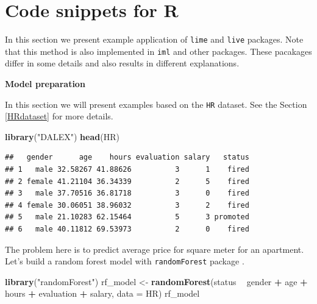 \documentclass[]{book}
\newenvironment{Shaded}{\begin{snugshade}}{\end{snugshade}}
\newcommand{\DataTypeTok}[1]{\textcolor[rgb]{0.13,0.29,0.53}{#1}}
\newcommand{\KeywordTok}[1]{\textcolor[rgb]{0.13,0.29,0.53}{\textbf{#1}}}
\newcommand{\NormalTok}[1]{#1}
\newcommand{\OperatorTok}[1]{\textcolor[rgb]{0.81,0.36,0.00}{\textbf{#1}}}
\newcommand{\StringTok}[1]{\textcolor[rgb]{0.31,0.60,0.02}{#1}}
\theoremstyle{definition}
\theoremstyle{definition}
\theoremstyle{definition}
\theoremstyle{remark}
\begin{document}
\hypertarget{code-snippets-for-r-3}{%
\section{Code snippets for R}\label{code-snippets-for-r-3}}

In this section we present example application of \texttt{lime}
\citep{R-lime} and \texttt{live} \citep{R-live} packages. Note that this
method is also implemented in \texttt{iml} \citep{R-iml} and other
packages. These pacakages differ in some details and also results in
different explanations.

\textbf{Model preparation}

In this section we will present examples based on the \texttt{HR}
dataset. See the Section \ref{HRdataset} for more details.

\begin{Shaded}
\begin{Highlighting}[]
\KeywordTok{library}\NormalTok{(}\StringTok{"DALEX"}\NormalTok{)}
\KeywordTok{head}\NormalTok{(HR)}
\end{Highlighting}
\end{Shaded}

\begin{verbatim}
##   gender      age    hours evaluation salary   status
## 1   male 32.58267 41.88626          3      1    fired
## 2 female 41.21104 36.34339          2      5    fired
## 3   male 37.70516 36.81718          3      0    fired
## 4 female 30.06051 38.96032          3      2    fired
## 5   male 21.10283 62.15464          5      3 promoted
## 6   male 40.11812 69.53973          2      0    fired
\end{verbatim}

The problem here is to predict average price for square meter for an
apartment. Let's build a random forest model with \texttt{randomForest}
package \citep{R-randomForest}.

\begin{Shaded}
\begin{Highlighting}[]
\KeywordTok{library}\NormalTok{(}\StringTok{"randomForest"}\NormalTok{)}
\NormalTok{rf_model <-}\StringTok{ }\KeywordTok{randomForest}\NormalTok{(status }\OperatorTok{~}\StringTok{ }\NormalTok{gender }\OperatorTok{+}\StringTok{ }\NormalTok{age }\OperatorTok{+}\StringTok{ }\NormalTok{hours }\OperatorTok{+}\StringTok{ }\NormalTok{evaluation }\OperatorTok{+}\StringTok{ }\NormalTok{salary, }\DataTypeTok{data =}\NormalTok{ HR)}
\NormalTok{rf_model}
\end{Highlighting}
\end{Shaded}
\end{document}
